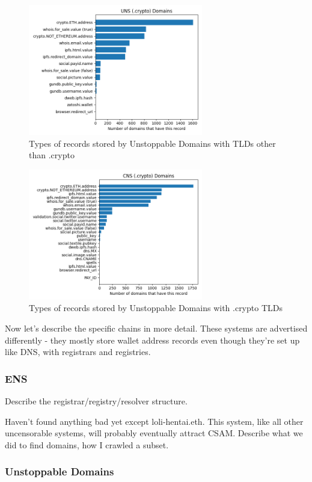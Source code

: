 \documentclass[10pt,sigconf,letterpaper]{acmart}
\begin{document}
\begin{figure}[t]
	\centering
	\includegraphics[width=3in]{uns_records.png}
	\caption{Types of records stored by Unstoppable 
	Domains with TLDs other than .crypto}
	\label{fig:uns_records}
\end{figure}
\begin{figure}[t]
	\centering
	\includegraphics[width=3in]{cns_records.png}
	\caption{Types of records stored by Unstoppable Domains 
	with .crypto TLDs}
	\label{fig:cns_records}
\end{figure}


Now let's describe the specific chains in more detail. These 
systems are advertised differently - they mostly store 
wallet address records even though they're set up like DNS, 
with registrars and registries. 

\subsubsection{ENS}

Describe the registrar/registry/resolver structure.

Haven't found anything bad yet except loli-hentai.eth. This 
system, like all other uncensorable systems, will probably 
eventually attract CSAM. Describe what we did to find 
domains, how I crawled a subset.

\subsubsection{Unstoppable Domains}
\end{document}
